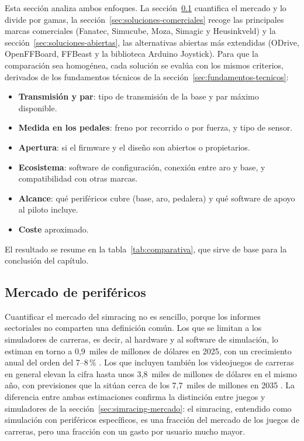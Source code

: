 Esta sección analiza ambos enfoques. La sección~\ref{sec:mercado-perifericos} cuantifica el mercado y lo divide por gamas, la sección~\ref{sec:soluciones-comerciales} recoge las principales marcas comerciales (Fanatec, Simucube, Moza, Simagic y Heusinkveld) y la sección~\ref{sec:soluciones-abiertas}, las alternativas abiertas más extendidas (ODrive, OpenFFBoard, FFBeast y la biblioteca Arduino Joystick). Para que la comparación sea homogénea, cada solución se evalúa con los mismos criterios, derivados de los fundamentos técnicos de la sección~\ref{sec:fundamentos-tecnicos}:
\begin{itemize}
	\item \textbf{Transmisión y par}: tipo de transmisión de la base y par máximo disponible.
	\item \textbf{Medida en los pedales}: freno por recorrido o por fuerza, y tipo de sensor.
	\item \textbf{Apertura}: si el firmware y el diseño son abiertos o propietarios.
	\item \textbf{Ecosistema}: software de configuración, conexión entre aro y base, y compatibilidad con otras marcas.
	\item \textbf{Alcance}: qué periféricos cubre (base, aro, pedalera) y qué software de apoyo al piloto incluye.
	\item \textbf{Coste} aproximado.
\end{itemize}
El resultado se resume en la tabla~\ref{tab:comparativa}, que sirve de base para la conclusión del capítulo.

\subsection{Mercado de periféricos}
\label{sec:mercado-perifericos}

Cuantificar el mercado del simracing no es sencillo, porque los informes sectoriales no comparten una definición común. Los que se limitan a los simuladores de carreras, es decir, al hardware y al software de simulación, lo estiman en torno a 0,9~miles de millones de dólares en 2025, con un crecimiento anual del orden del 7--8\,\% \parencite{tbrc_2026_racing_sim}. Los que incluyen también los videojuegos de carreras en general elevan la cifra hasta unos 3,8~miles de millones de dólares en el mismo año, con previsiones que la sitúan cerca de los 7,7~miles de millones en 2035 \parencite{mri_2025_car_racing_games}. La diferencia entre ambas estimaciones confirma la distinción entre juegos y simuladores de la sección~\ref{sec:simracing-mercado}: el simracing, entendido como simulación con periféricos específicos, es una fracción del mercado de los juegos de carreras, pero una fracción con un gasto por usuario mucho mayor.

